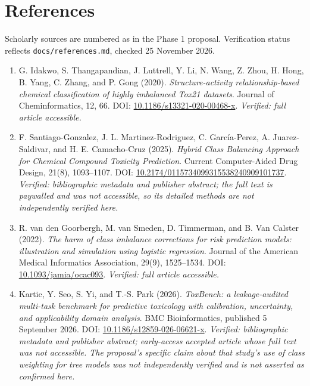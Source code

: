\documentclass[10pt,letterpaper]{article}
\begin{document}
\section{References}

Scholarly sources are numbered as in the Phase 1 proposal. Verification status reflects
\texttt{docs/references.md}, checked 25 November 2026.

\begin{enumerate}\setlength{\itemsep}{2pt}
\item G. Idakwo, S. Thangapandian, J. Luttrell, Y. Li, N. Wang, Z. Zhou, H. Hong, B. Yang, C. Zhang,
and P. Gong (2020). \emph{Structure-activity relationship-based chemical classification of highly
imbalanced Tox21 datasets}. Journal of Cheminformatics, 12, 66.
DOI: \href{https://doi.org/10.1186/s13321-020-00468-x}{10.1186/s13321-020-00468-x}.
\emph{Verified: full article accessible.}

\item F. Santiago-Gonzalez, J. L. Martinez-Rodriguez, C. Garc\'ia-Perez, A. Juarez-Saldivar, and
H. E. Camacho-Cruz (2025). \emph{Hybrid Class Balancing Approach for Chemical Compound Toxicity
Prediction}. Current Computer-Aided Drug Design, 21(8), 1093--1107. DOI:
\href{https://doi.org/10.2174/0115734099315538240909101737}{10.2174/0115734099315538240909101737}.
\emph{Verified: bibliographic metadata and publisher abstract; the full text is paywalled and was not
accessible, so its detailed methods are not independently verified here.}

\item R. van den Goorbergh, M. van Smeden, D. Timmerman, and B. Van Calster (2022). \emph{The harm of
class imbalance corrections for risk prediction models: illustration and simulation using logistic
regression}. Journal of the American Medical Informatics Association, 29(9), 1525--1534.
DOI: \href{https://doi.org/10.1093/jamia/ocac093}{10.1093/jamia/ocac093}.
\emph{Verified: full article accessible.}

\item Kartic, Y. Seo, S. Yi, and T.-S. Park (2026). \emph{ToxBench: a leakage-audited multi-task
benchmark for predictive toxicology with calibration, uncertainty, and applicability domain
analysis}. BMC Bioinformatics, published 5 September 2026.
DOI: \href{https://doi.org/10.1186/s12859-026-06621-x}{10.1186/s12859-026-06621-x}.
\emph{Verified: bibliographic metadata and publisher abstract; early-access accepted article whose
full text was not accessible. The proposal's specific claim about that study's use of class weighting
for tree models was not independently verified and is not asserted as confirmed here.}


\end{enumerate}
\end{document}
